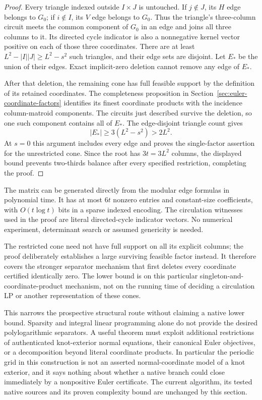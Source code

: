 \begin{proof}
Every triangle indexed outside $I\times J$ is untouched.  If $j\notin J$,
its $H$ edge belongs to $G_0$; if $i\notin I$, its $V$ edge belongs to $G_0$.
Thus the triangle's three-column circuit meets the common component of
$G_0$ in an edge and joins all three columns to it.  Its directed cycle
indicator is also a nonnegative kernel vector positive on each of those
three coordinates.  There are at least $L^2-|I||J|\ge L^2-s^2$ such
triangles, and their edge sets are disjoint.  Let $E_*$ be the union of their
edges.  Exact implicit-zero deletion cannot remove any edge of $E_*$.

After that deletion, the remaining cone has full feasible support by the
definition of its retained coordinates.  The completeness proposition in
Section~\ref{sec:euler-coordinate-factors} identifies its finest coordinate
products with the incidence column-matroid components.  The circuits just
described survive the deletion, so one such component contains all of $E_*$.
The edge-disjoint triangle count gives
\[
                    |E_*|\ge3(L^2-s^2)>2L^2.
\]
At $s=0$ this argument includes every edge and proves the single-factor
assertion for the unrestricted cone.  Since the root has $3t=3L^2$ columns,
the displayed bound prevents two-thirds balance after every specified
restriction, completing the proof.
\end{proof}

The matrix can be generated directly from the modular edge formulas in
polynomial time.  It has at most $6t$ nonzero entries and constant-size
coefficients, with $O(t\log t)$ bits in a sparse indexed encoding.  The
circulation witnesses used in the proof are literal directed-cycle indicator
vectors.  No numerical experiment, determinant search or assumed genericity
is needed.

The restricted cone need not have full support on all its explicit columns;
the proof deliberately establishes a large surviving feasible factor instead.
It therefore covers the stronger separator mechanism that first deletes
every coordinate certified identically zero.  The lower bound is on this
particular singleton-and-coordinate-product mechanism, not on the running
time of deciding a circulation LP or another representation of these cones.

This narrows the prospective structural route without claiming a native
lower bound.  Sparsity and integral linear programming alone do not provide
the desired polylogarithmic separators.  A useful theorem must exploit
additional restrictions of authenticated knot-exterior normal equations,
their canonical Euler objectives, or a decomposition beyond literal
coordinate products.  In particular the periodic grid in this construction
is not an asserted normal-coordinate model of a knot exterior, and it says
nothing about whether a native branch could close immediately by a
nonpositive Euler certificate.  The current algorithm, its tested native
sources and its proven complexity bound are unchanged by this section.
